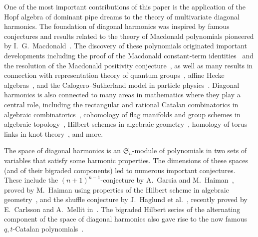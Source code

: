 \documentclass{amsart}
\theoremstyle{definition}
\begin{document}
One of the most important contributions of this paper is the application of the Hopf algebra of dominant pipe dreams to the theory of multivariate diagonal harmonics.
The foundation of diagonal harmonics was inspired by famous conjectures and results related to the theory of Macdonald polynomials pioneered by I.~G.~Macdonald~\cite{Macdonald-newClassSymFunct}.
The discovery of these polynomials originated important developments including the proof of the Macdonald constant-term identities~\cite{Cherednik} and the resolution of the Macdonald positivity conjecture~\cite{Haiman-hilbertSchemes}, as well as many results in connection with representation theory of quantum groups~\cite{EtingofKirillov}, affine Hecke algebras~\cite{KirillovNoumi, Knop, Macconald-affineHeckeAlgebras}, and the Calogero--Sutherland model in particle physics~\cite{LapointeVinet}.
Diagonal harmonics is also connected to many areas in mathematics where they play a central role, including the rectangular and rational Catalan combinatorics in algebraic combinatorics~\cite{ArmstrongLoehrWarrington-parking, ArmstrongLoehrWarrington-sweep, Bergeron-rectangular, BergeronGarsiaSergelLevenXin-compositional, Mellit-rationalshuffle}, cohomology of flag manifolds and group schemes in algebraic topology~\cite{DalalMorse},
Hilbert schemes in algebraic geometry~\cite{Haiman-hilbertSchemes, Haiman-vanishingTheorems}, homology of torus links in knot theory~\cite{GorskyNegut, Mellit-Homology}, and more.

The space of diagonal harmonics is an $\mathfrak{S}_n$-module of polynomials in two sets of variables that satisfy some harmonic properties.
The dimensions of these spaces (and of their bigraded components) led to numerous important conjectures.
These include the $(n+1)^{n-1}$-conjecture by A.~Garsia and M.~Haiman~\cite{GarsiaHaiman-gradedRepresentationModel, GarsiaHaiman-BigradedModules}, proved by M.~Haiman using properties of the Hilbert scheme in algebraic geometry~\cite{Haiman-vanishingTheorems}, and the shuffle conjecture by J.~Haglund et al.~\cite{HaglundHaimanLoehrRemmelUlyanov}, recently proved by E.~Carlsson and A.~Mellit in~\cite{CarlssonMellit}.
The bigraded Hilbert series of the alternating component of the space of diagonal harmonics also gave rise to the now famous \mbox{$q,t$-Catalan} polynomials~\cite{Haglund-qt-catalan}.
\end{document}
